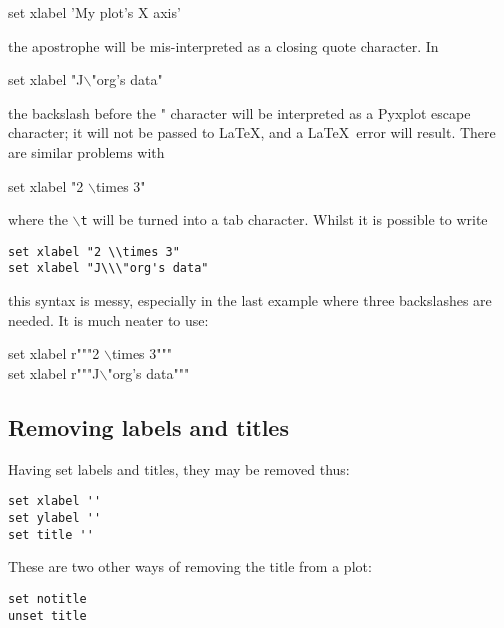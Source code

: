 \begin{dontdo}
set xlabel 'My plot's X axis'
\end{dontdo}

\noindent the apostrophe will be mis-interpreted as a closing quote character. In

\begin{dontdo}
set xlabel "J$\backslash$"org's data"
\end{dontdo}

\noindent the backslash before the " character will be interpreted as a Pyxplot escape character; it will not be passed to \LaTeX, and a \LaTeX\ error will result. There are similar problems with

\begin{dontdo}
set xlabel "2 $\backslash$times 3"
\end{dontdo}

\noindent where the \texttt{$\backslash$t} will be turned into a tab character. Whilst it is possible to write

\begin{verbatim}
set xlabel "2 \\times 3"
set xlabel "J\\\"org's data"
\end{verbatim}

\noindent this syntax is messy, especially in the last example where three backslashes are needed. It is much neater to use:

\begin{dodo}
set xlabel r"""2 $\backslash$times 3"""\\
set xlabel r"""J$\backslash$"org's data"""
\end{dodo}

\subsection{Removing labels and titles}

Having set labels and titles, they may be removed thus:

\begin{verbatim}
set xlabel ''
set ylabel ''
set title ''
\end{verbatim}

\noindent These are two other ways of removing the title from a plot:

\begin{verbatim}
set notitle
unset title
\end{verbatim}

